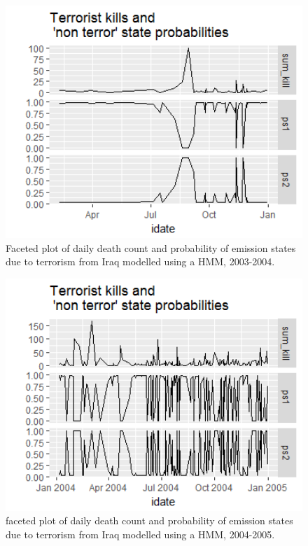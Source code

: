 \begin{figure}[t]
\includegraphics[width=15cm]{Peters_experiment_markdown_files/figure-latex/Rplot02_2003_2004.png}
\caption{Faceted plot of daily death count and probability of emission states due to terrorism from Iraq modelled using a HMM, 2003-2004.}
\label{fig:Rplot02_hmm_2003_2004}
\centering
\end{figure}

\begin{figure}[t]
\includegraphics[width=15cm]{Peters_experiment_markdown_files/figure-latex/Rplot02_2004_2005.png}
\caption{faceted plot of daily death count and probability of emission states due to terrorism from Iraq modelled using a HMM, 2004-2005.}
\label{fig:Rplot02_2004_2005}
\centering
\end{figure}

